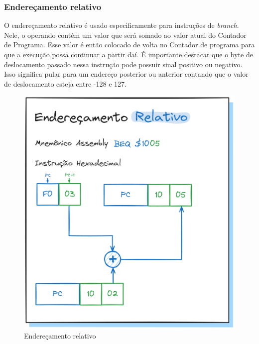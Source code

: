\documentclass[
	12pt,				  %
	openright,		%
	a4paper,			%
	english,			%
	french,				%
	spanish,			%
	brazil,				%
]{abntex2}
\begin{document}
\subsubsection{Endereçamento relativo}
O endereçamento relativo é usado especificamente para instruções de
\emph{branch}. Nele, o operando contém um valor que será somado ao valor atual
do Contador de Programa. Esse valor é então colocado de volta no Contador de
programa para que a execução possa continuar a partir daí.
É importante destacar que o byte de deslocamento passado nessa instrução pode
possuir sinal positivo ou negativo. Isso significa pular para um endereço
posterior ou anterior contando que o valor de deslocamento esteja entre -128
e 127.
\begin{figure}[h]
	\centering
	\caption{Endereçamento relativo} \label{fig:address:rel}
	\includegraphics[scale=0.25]{../assets/img/addressing-modes-rel.png}
\end{figure}
\end{document}
